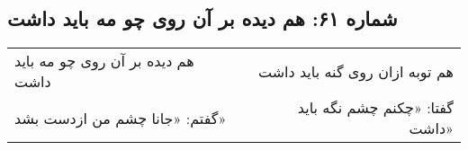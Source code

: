 \begin{center}
\section*{شماره ۶۱: هم دیده بر آن روی چو مه باید داشت}
\label{sec:061}
\begin{longtable}{l p{0.5cm} r}
هم دیده بر آن روی چو مه باید داشت
&&
هم توبه ازان روی گنه باید داشت
\\
گفتم: «جانا چشم من ازدست بشد»
&&
گفتا: «چکنم چشم نگه باید داشت»
\\
\end{longtable}
\end{center}
